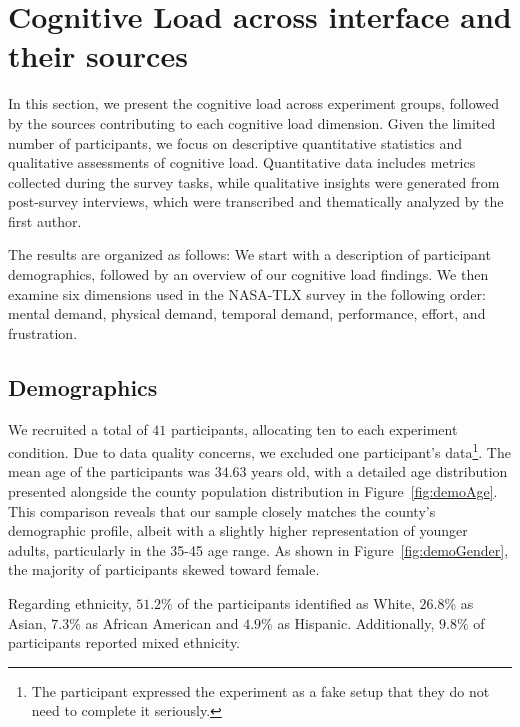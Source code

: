 

\section{Cognitive Load across interface and their sources}
\label{sec:cog_result}
In this section, we present the cognitive load across experiment groups, followed by the sources contributing to each cognitive load dimension. Given the limited number of participants, we focus on descriptive quantitative statistics and qualitative assessments of cognitive load. Quantitative data includes metrics collected during the survey tasks, while qualitative insights were generated from post-survey interviews, which were transcribed and thematically analyzed by the first author.

The results are organized as follows: We start with a description of participant demographics, followed by an overview of our cognitive load findings. We then examine six dimensions used in the NASA-TLX survey in the following order: mental demand, physical demand, temporal demand, performance, effort, and frustration. 

\subsection{Demographics}
We recruited a total of $41$ participants, allocating ten to each experiment condition. Due to data quality concerns, we excluded one participant's data\footnote{The participant expressed the experiment as a fake setup that they do not need to complete it seriously.}. The mean age of the participants was $34.63$ years old, with a detailed age distribution presented alongside the county population distribution in Figure~\ref{fig:demoAge}. This comparison reveals that our sample closely matches the county's demographic profile, albeit with a slightly higher representation of younger adults, particularly in the 35-45 age range. As shown in Figure~\ref{fig:demoGender}, the majority of participants skewed toward female.

Regarding ethnicity, $51.2\%$ of the participants identified as White, $26.8\%$ as Asian, $7.3\%$ as African American and $4.9\%$ as Hispanic. Additionally, $9.8\%$ of participants reported mixed ethnicity.

